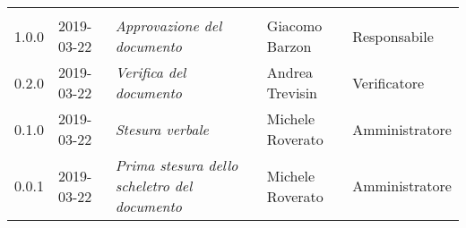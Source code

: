 \newpage 
\section*{}
	\begin{longtable}{C{2cm}|C{2.5cm}|C{4.5cm}|C{2.5cm}|C{3cm}}
	
	 &  &  &  &   \\
	\endhead
		
		1.0.0 & 2019-03-22 &  \emph{Approvazione del documento} & Giacomo Barzon & Responsabile\\
		\hline
		
		0.2.0 & 2019-03-22 & \emph{Verifica del documento} & Andrea Trevisin & Verificatore \\
		\hline
		
		0.1.0 & 2019-03-22 & \emph{Stesura verbale} & Michele Roverato & Amministratore \\
		\hline
		
		0.0.1 & 2019-03-22 & \emph{Prima stesura dello scheletro del documento} & Michele Roverato & Amministratore \\
		
\end{longtable}



\clearpage